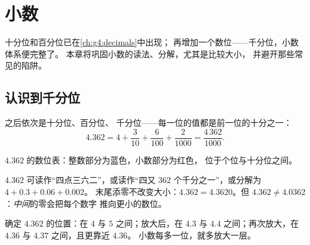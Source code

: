 \chapter{小数}\label{ch:g5:decimals}

十分位和百分位已在\cref{ch:g4:decimals}中出现；
再增加一个数位——千分位，小数体系便完整了。
本章将巩固小数的读法、分解，尤其是比较大小，
并避开那些常见的陷阱。

\section{认识到千分位}

\begin{definition}[小数的数位]\label{def:g5:decimals:places}
之后依次是十分位、百分位、
千分位——每一位的值都是前一位的十分之一：
\[
4.362 = 4 + \frac{3}{10} + \frac{6}{100} + \frac{2}{1000}
= \frac{4\,362}{1000}.
\]
\end{definition}

\begin{omfigure}

{\small $4.362$ 的数位表：整数部分为蓝色，小数部分为红色，
位于个位与十分位之间。}
\end{omfigure}

\begin{example}\label{ex:g5:decimals:readings}
$4.362$ 可读作“四点三六二”，或读作“四又
$362$ 个千分之一”，或分解为 $4 + 0.3 + 0.06 + 0.002$。
末尾添零不改变大小：$4.362 = 4.3620$。但
$4.362 \neq 4.0362$：\emph{中间}的零会把每个数字
推向更小的数位。
\end{example}

\begin{example}[它在数轴上的位置]\label{ex:g5:decimals:line}
确定 $4.362$ 的位置：在 $4$ 与 $5$ 之间；放大后，在 $4.3$ 与
$4.4$ 之间；再次放大，在 $4.36$ 与 $4.37$ 之间，且更靠近 $4.36$。
小数每多一位，就多放大一层。
\end{example}

